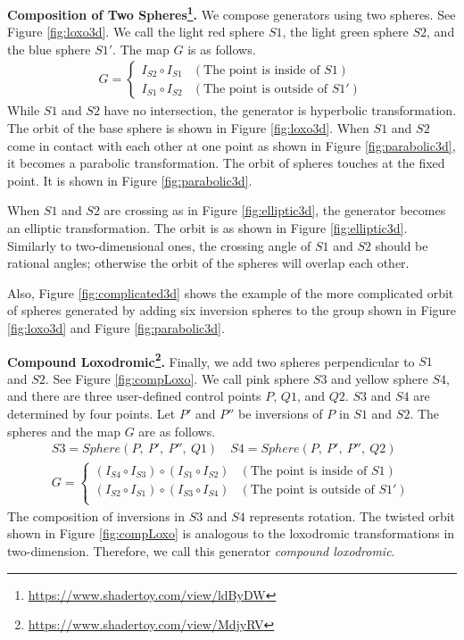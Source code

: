 \noindent\textbf{Composition of Two
Spheres\footnote{\url{https://www.shadertoy.com/view/ldByDW}}.}
We compose generators using two spheres.
See Figure \ref{fig:loxo3d}.
We call the light red sphere $S1$, the light green sphere $S2$, and the blue
sphere $S1'$.
The map $G$ is as follows.
\begin{align*}
G =
\begin{cases}
 I_{S2} \circ I_{S1} & (\text{The point is inside of } S1) \\
 I_{S1} \circ I_{S2} & (\text{The point is outside of }S1')
\end{cases}
\end{align*}
While $S1$ and $S2$ have no intersection, the generator is hyperbolic
transformation.
The orbit of the base sphere is shown in Figure \ref{fig:loxo3d}.
When $S1$ and $S2$ come in contact with each other at one point as shown
in Figure \ref{fig:parabolic3d}, it becomes a
parabolic transformation.
The orbit of spheres touches at the fixed point.
It is shown in Figure \ref{fig:parabolic3d}.

When $S1$ and $S2$ are crossing as in Figure \ref{fig:elliptic3d},
the generator becomes an elliptic transformation.
The orbit is as shown in Figure \ref{fig:elliptic3d}.
Similarly to two-dimensional ones, the crossing angle of $S1$ and $S2$
should be rational angles;
otherwise the orbit of the spheres will overlap each other.

Also, Figure \ref{fig:complicated3d} shows the example of the more
complicated orbit of spheres generated by adding six inversion spheres to
the group shown in Figure \ref{fig:loxo3d} and Figure \ref{fig:parabolic3d}.

\noindent\textbf{Compound
Loxodromic\footnote{\url{https://www.shadertoy.com/view/MdjyRV}}.}
Finally, we add two spheres perpendicular to $S1$ and $S2$.
See Figure \ref{fig:compLoxo}.
We call pink sphere $S3$ and yellow sphere $S4$, and there are three
user-defined control points $P$, $Q1$, and $Q2$.
$S3$ and $S4$ are determined by four points.
Let $P'$ and $P''$ be inversions of $P$ in $S1$ and $S2$.
The spheres and the map $G$ are as follows.
\begin{align*}
S3 = Sphere(P,~P',~P'',~Q1) \quad
S4 = Sphere(P,~P',~P'',~Q2) \\
G =
\begin{cases}
 (I_{S4} \circ I_{S3}) \circ (I_{S1} \circ I_{S2}) & (\text{The point is inside of } S1) \\
 (I_{S2} \circ I_{S1}) \circ (I_{S3} \circ I_{S4}) & (\text{The point is outside of }S1')\\
\end{cases}
\end{align*}
The composition of inversions in $S3$ and $S4$ represents rotation.
The twisted orbit shown in Figure
\ref{fig:compLoxo} is analogous to the loxodromic
transformations in two-dimension.
Therefore, we call this generator \textit{compound loxodromic}.



